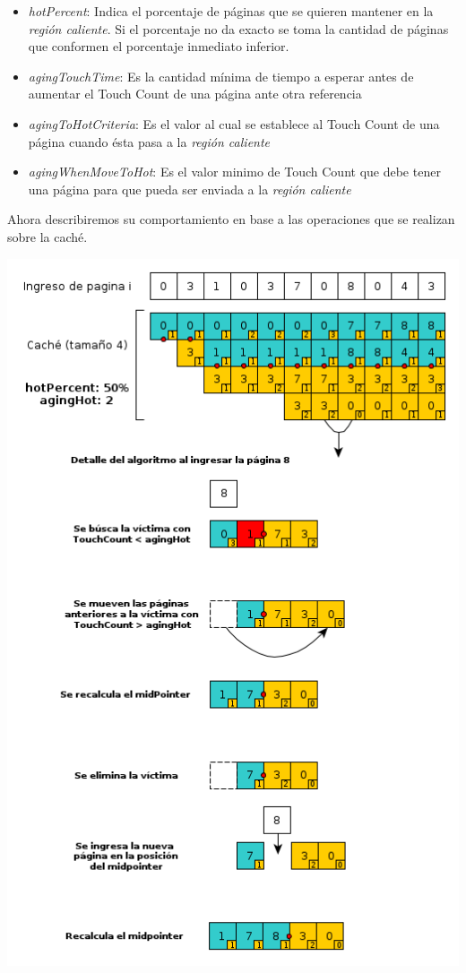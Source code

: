 \documentclass[11pt, a4paper, spanish]{article}
\begin{document}
\begin{itemize}
	\item{\emph{hotPercent}: Indica el porcentaje de p\'aginas que se quieren mantener en la \textit{regi\'on caliente}. Si el porcentaje no
da exacto se toma la cantidad de p\'aginas que conformen el porcentaje inmediato inferior. }
	\item{\emph{agingTouchTime}: Es la cantidad m\'inima de tiempo a esperar antes de aumentar el Touch Count de una p\'agina ante otra referencia}
	\item{\emph{agingToHotCriteria}: Es el valor al cual se establece al Touch Count de una p\'agina cuando \'esta pasa a la \textit{regi\'on caliente} }
	\item{\emph{agingWhenMoveToHot}: Es el valor minimo de Touch Count que debe tener una p\'agina para que pueda ser enviada a la \textit{regi\'on caliente}}
\end{itemize}

Ahora describiremos su comportamiento en base a las operaciones que se realizan sobre la cach\'e.

\begin{center}
	\includegraphics[scale=0.65]{diagramas/TouchCountAlgorithm2.png}\\
\end{center}
\end{document}
